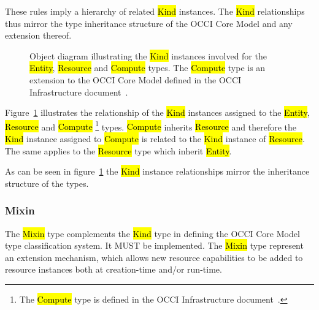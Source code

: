 \documentclass[10pt,a4paper]{article}
\begin{document}
These rules imply a hierarchy of related \hl{Kind} instances. The
\hl{Kind} relationships thus mirror the type inheritance structure of
the OCCI Core Model and any extension thereof.

\begin{figure}[!h]
  {\centering {} \par}
  \caption{Object diagram illustrating the \hl{Kind} instances
    involved for the \hl{Entity}, \hl{Resource} and \hl{Compute}
    types. The \hl{Compute} type is an extension to the OCCI Core
    Model defined in the OCCI Infrastructure
    document~\cite{occi:infrastructure}.}
  \label{fig:kind_relationships}
\end{figure}

Figure~\ref{fig:kind_relationships} illustrates the relationship of
the \hl{Kind} instances assigned to the \hl{Entity}, \hl{Resource} and
\hl{Compute}%
\footnote{The \hl{Compute} type is defined in the OCCI Infrastructure
 document~\cite{occi:infrastructure}.}
types.
%
\hl{Compute} inherits \hl{Resource} and therefore the \hl{Kind}
instance assigned to \hl{Compute} is related to the \hl{Kind} instance
of \hl{Resource}.  The same applies to the \hl{Resource} type which
inherit \hl{Entity}.

As can be seen in figure~\ref{fig:kind_relationships} the \hl{Kind}
instance relationships mirror the inheritance structure of the types.

\subsubsection{Mixin}
The \hl{Mixin} type complements the \hl{Kind} type in defining the
OCCI Core Model type classification system. It MUST be
implemented. The \hl{Mixin} type represent an extension mechanism,
which allows new resource capabilities to be added to resource
instances both at creation-time and/or run-time.
\end{document}
